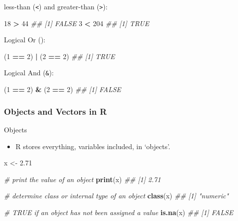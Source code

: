 \documentclass[
]{book}
\newenvironment{Shaded}{\begin{snugshade}}{\end{snugshade}}
\newcommand{\CommentTok}[1]{\textcolor[rgb]{0.56,0.35,0.01}{\textit{#1}}}
\newcommand{\DecValTok}[1]{\textcolor[rgb]{0.00,0.00,0.81}{#1}}
\newcommand{\FloatTok}[1]{\textcolor[rgb]{0.00,0.00,0.81}{#1}}
\newcommand{\KeywordTok}[1]{\textcolor[rgb]{0.13,0.29,0.53}{\textbf{#1}}}
\newcommand{\NormalTok}[1]{#1}
\newcommand{\OperatorTok}[1]{\textcolor[rgb]{0.81,0.36,0.00}{\textbf{#1}}}
\newcommand{\StringTok}[1]{\textcolor[rgb]{0.31,0.60,0.02}{#1}}
\providecommand{\tightlist}{%
  \setlength{\itemsep}{0pt}\setlength{\parskip}{0pt}}
\begin{document}
less-than (\texttt{\textless{}}) and greater-than (\texttt{\textgreater{}}):

\begin{Shaded}
\begin{Highlighting}[]
\DecValTok{18} \OperatorTok{>}\StringTok{ }\DecValTok{44}
\CommentTok{## [1] FALSE}
\DecValTok{3} \OperatorTok{<}\StringTok{ }\DecValTok{204}
\CommentTok{## [1] TRUE}
\end{Highlighting}
\end{Shaded}

Logical Or (\texttt{\textbar{}}):

\begin{Shaded}
\begin{Highlighting}[]
\NormalTok{(}\DecValTok{1} \OperatorTok{==}\StringTok{ }\DecValTok{2}\NormalTok{) }\OperatorTok{|}\StringTok{ }\NormalTok{(}\DecValTok{2} \OperatorTok{==}\StringTok{ }\DecValTok{2}\NormalTok{)}
\CommentTok{## [1] TRUE}
\end{Highlighting}
\end{Shaded}

Logical And (\texttt{\&}):

\begin{Shaded}
\begin{Highlighting}[]
\NormalTok{(}\DecValTok{1} \OperatorTok{==}\StringTok{ }\DecValTok{2}\NormalTok{) }\OperatorTok{&}\StringTok{ }\NormalTok{(}\DecValTok{2} \OperatorTok{==}\StringTok{ }\DecValTok{2}\NormalTok{)}
\CommentTok{## [1] FALSE}
\end{Highlighting}
\end{Shaded}

\hypertarget{objects-and-vectors-in-r}{%
\subsubsection*{Objects and Vectors in R}\label{objects-and-vectors-in-r}}

Objects

\begin{itemize}
\tightlist
\item
  R stores everything, variables included, in `objects'.
\end{itemize}

\begin{Shaded}
\begin{Highlighting}[]
\NormalTok{x <-}\StringTok{ }\FloatTok{2.71}

\CommentTok{# print the value of an object}
\KeywordTok{print}\NormalTok{(x)}
\CommentTok{## [1] 2.71}

\CommentTok{# determine class or internal type of an object}
\KeywordTok{class}\NormalTok{(x)}
\CommentTok{## [1] "numeric"}

\CommentTok{# TRUE if an object has not been assigned a value}
\KeywordTok{is.na}\NormalTok{(x)}
\CommentTok{## [1] FALSE}
\end{Highlighting}
\end{Shaded}
\end{document}
